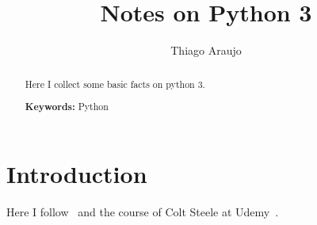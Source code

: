 \documentclass[a4paper,11pt]{amsart}
\begin{document}


\title[Notes on Python]{Notes on Python 3}

\author{Thiago Araujo}



\begin{abstract}
Here I collect some basic facts on python 3.

\bigskip

\noindent \textbf{Keywords:} Python
\end{abstract}

\maketitle

\setcounter{tocdepth}{2}
\tableofcontents


\section*{Introduction}

Here I follow~\cite{pythontutorial} and the course of Colt Steele at Udemy~\cite{csteele}.
















\clearpage

\appendix 











\clearpage



\end{document}
